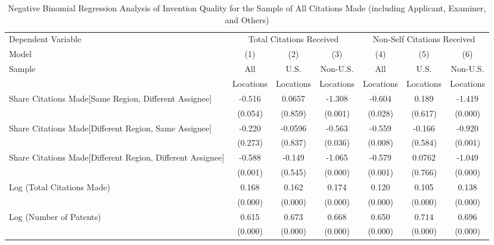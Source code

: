 \begin{sidewaystable}[htbp]\centering

\captionsetup{
  labelformat=center,
  labelsep=newline,
  justification=justified,
  margin=.1\textwidth
}
\caption{Negative Binomial Regression Analysis of Invention Quality for the Sample of All Citations Made (including Applicant, Examiner, and Others) \label{a.e.o.t.n.model123192021}}
\small
\onehalfspacing
\begin{tabular}{l*{6}{c}}
\hline\hline
 Dependent Variable&\multicolumn{3}{c}{Total Citations Received}&\multicolumn{3}{c}{Non-Self Citations Received}\\
                Model&\multicolumn{1}{c}{(1)}&\multicolumn{1}{c}{(2)}&\multicolumn{1}{c}{(3)}&\multicolumn{1}{c}{(4)}&\multicolumn{1}{c}{(5)}&\multicolumn{1}{c}{(6)}\\
                 \hline
 \multirow{2}{*}{Sample}&\multicolumn{1}{c}{All}&\multicolumn{1}{c}{U.S.}&\multicolumn{1}{c}{Non-U.S.}&\multicolumn{1}{c}{All}&\multicolumn{1}{c}{U.S.}&\multicolumn{1}{c}{Non-U.S.}\\       
  &\multicolumn{1}{c}{Locations}&\multicolumn{1}{c}{Locations}&\multicolumn{1}{c}{Locations}&\multicolumn{1}{c}{Locations}&\multicolumn{1}{c}{Locations}&\multicolumn{1}{c}{Locations}\\           
\hline
Share Citations Made[Same Region, Different Assignee]&   -0.516&   0.0657&   -1.308&   -0.604&    0.189&   -1.419\\
                &  (0.054)&  (0.859)&  (0.001)&  (0.028)&  (0.617)&  (0.000)\\
Share Citations Made[Different Region, Same Assignee]&   -0.220&  -0.0596&   -0.563&   -0.559&   -0.166&   -0.920\\
                &  (0.273)&  (0.837)&  (0.036)&  (0.008)&  (0.584)&  (0.001)\\
Share Citations Made[Different Region, Different Assignee]&   -0.588&   -0.149&   -1.065&   -0.579&   0.0762&   -1.049\\
                &  (0.001)&  (0.545)&  (0.000)&  (0.001)&  (0.766)&  (0.000)\\
Log (Total Citations Made)&    0.168&    0.162&    0.174&    0.120&    0.105&    0.138\\
                &  (0.000)&  (0.000)&  (0.000)&  (0.000)&  (0.000)&  (0.000)\\
Log (Number of Patents)&    0.615&    0.673&    0.668&    0.650&    0.714&    0.696\\
                &  (0.000)&  (0.000)&  (0.000)&  (0.000)&  (0.000)&  (0.000)\\

\end{tabular}
\end{sidewaystable}
